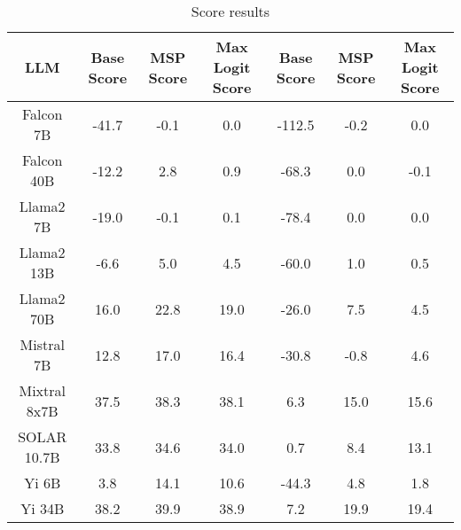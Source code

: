 \renewcommand\arraystretch{1.2}
\begin{table*}
\centering
\begin{tabular}{c|c|c|c|c|c|c}
LLM & Base Score & MSP Score & Max Logit Score & Base Score & MSP Score & Max Logit Score\\ \hline
Falcon 7B & -41.7 & -0.1 & 0.0 & -112.5 & -0.2 & 0.0\\
Falcon 40B & -12.2 & 2.8 & 0.9 & -68.3 & 0.0 & -0.1\\
Llama2 7B & -19.0 & -0.1 & 0.1 & -78.4 & 0.0 & 0.0\\
Llama2 13B & -6.6 & 5.0 & 4.5 & -60.0 & 1.0 & 0.5\\
Llama2 70B & 16.0 & 22.8 & 19.0 & -26.0 & 7.5 & 4.5\\
Mistral 7B & 12.8 & 17.0 & 16.4 & -30.8 & -0.8 & 4.6\\
Mixtral 8x7B & 37.5 & 38.3 & 38.1 & 6.3 & 15.0 & 15.6\\
SOLAR 10.7B & 33.8 & 34.6 & 34.0 & 0.7 & 8.4 & 13.1\\
Yi 6B & 3.8 & 14.1 & 10.6 & -44.3 & 4.8 & 1.8\\
Yi 34B & 38.2 & 39.9 & 38.9 & 7.2 & 19.9 & 19.4\\
\hline
\end{tabular}
\caption{Score results}
\end{table*}
\label{tab:score}
